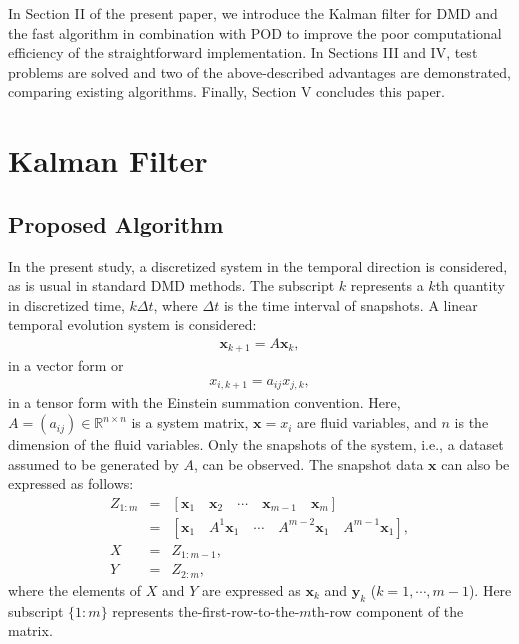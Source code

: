 \documentclass[aip,graphicx]{revtex4-1}
\begin{document}
In Section II of the present paper, we introduce the Kalman filter for DMD and the fast algorithm in combination with POD to improve the poor computational efficiency of the straightforward implementation. In Sections III and IV, test problems are solved and two of the above-described advantages are demonstrated, comparing existing algorithms. Finally, Section V concludes this paper. 


%


\section{Kalman Filter}
\label{sec:KF}
\subsection{Proposed Algorithm}
\label{sec:PA}
In the present study, a discretized system in the temporal direction is considered, as is usual in standard DMD methods.
The subscript $k$ represents a $k$th quantity in discretized time, $k\Delta t$, where $\Delta t$ is the time interval of snapshots. 
A linear temporal evolution system is considered: 
\begin{eqnarray}
\bm{x}_{k+1} = A \bm{x}_k,
\end{eqnarray}
in a vector form or
\begin{eqnarray}
x_{i,k+1} = a_{ij} {x}_{j,k},
\end{eqnarray}
in a tensor form with the Einstein summation convention. 
Here, $A=(a_{ij}) \in \mathbb{R}^{n\times n}$
is a system matrix, $\bm{x}={x_i}$ are fluid variables, and $n$ is the dimension of the fluid variables. 
Only the snapshots of the system, i.e., a dataset assumed to be generated by $A$, can be observed. 
The snapshot data $\bm{x}$ can also be expressed as follows:
\begin{eqnarray}
	Z_{1:m} &=& \left[ \bm{x}_{1} \quad \bm{x}_{2} \quad  \cdots \quad  \bm{x}_{m-1} \quad  \bm{x}_{m}\right] \nonumber\\ 
	        &=& \left[ \bm{x}_{1} \quad A^{1}\bm{x}_{1} \quad  \cdots \quad  A^{m-2} \bm{x}_{1} \quad  A^{m-1} \bm{x}_{1}\right],\nonumber\\
	        X&=&Z_{1:m-1},\nonumber\\
	        Y&=&Z_{2:m},\label{eq:tsdata}
\end{eqnarray}
where the elements of $X$ and $Y$ are expressed as $\bm{x}_k$ and $\bm{y}_k$ ($k=1, \cdots , m-1$). Here subscript $\{1:m\}$ represents the-first-row-to-the-$m$th-row component of the matrix.
%
\end{document}

